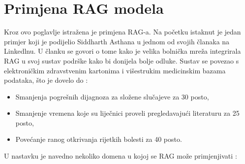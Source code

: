 \documentclass[]{foi}
\begin{document}
\section{Primjena RAG modela}

Kroz ovo poglavlje istražena je primjena RAG-a. Na početku istaknut je jedan primjer koji je podijelio Siddharth Asthana u jednom od svojih
članaka na Linkedlnu. U članku se govori o tome kako je velika bolnička mreža integrirala RAG u svoj sustav podrške kako bi donijela bolje odluke.
Sustav se povezao s elektroničkim zdravstvenim kartonima i višestrukim medicinskim bazama podataka, što je dovelo do \cite{siddharth2025rag}:
\begin{itemize}
    \item Smanjenja pogrešnih dijagnoza za složene slučajeve za 30 posto,
    \item Smanjenje vremena koje su liječnici proveli pregledavajući literaturu za 25 posto,
    \item Povećanje ranog otkrivanja rijetkih bolesti za 40 posto.
\end{itemize}

U nastavku je navedno nekoliko domena u kojoj se RAG može primjenjivati \cite{nishtha2025rag}:
\end{document}

